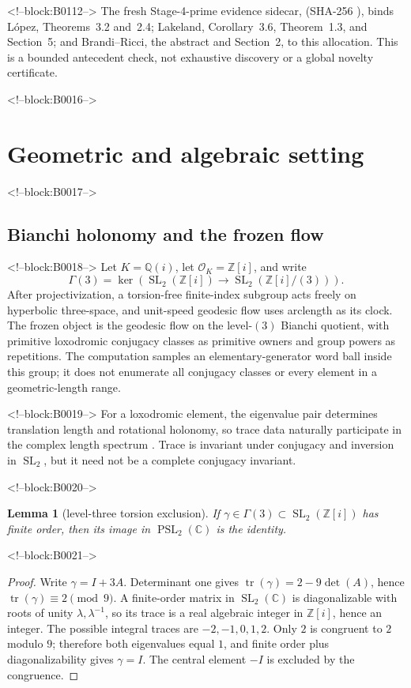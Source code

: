 \documentclass[11pt,a4paper]{article}
\newtheorem{lemma}[theorem]{Lemma}
\theoremstyle{definition}
\theoremstyle{remark}
\newcommand{\SL}{\operatorname{SL}}
\newcommand{\tr}{\operatorname{tr}}
\newcommand{\Gauss}{\mathbb{Z}[i]}
\begin{document}
<!--block:B0112-->
The fresh Stage-4-prime evidence sidecar,  (SHA-256 ), binds López, Theorems~3.2 and~2.4; Lakeland, Corollary~3.6, Theorem~1.3, and Section~5; and Brandi--Ricci, the abstract and Section~2, to this allocation. This is a bounded antecedent check, not exhaustive discovery or a global novelty certificate.

<!--block:B0016-->
\section{Geometric and algebraic setting}

<!--block:B0017-->
\subsection{Bianchi holonomy and the frozen flow}

<!--block:B0018-->
Let \(K=\mathbb{Q}(i)\), let \(\mathcal O_K=\Gauss\), and write
\[
 \Gamma(3)=\ker\!\left(\SL_2(\Gauss)\longrightarrow\SL_2(\Gauss/(3))\right).
\]
After projectivization, a torsion-free finite-index subgroup acts freely on hyperbolic three-space, and unit-speed geodesic flow uses arclength as its clock. The frozen object is the geodesic flow on the level-\((3)\) Bianchi quotient, with primitive loxodromic conjugacy classes as primitive owners and group powers as repetitions. The computation samples an elementary-generator word ball inside this group; it does not enumerate all conjugacy classes or every element in a geometric-length range.

<!--block:B0019-->
For a loxodromic element, the eigenvalue pair determines translation length and rotational holonomy, so trace data naturally participate in the complex length spectrum \citep[Introduction and Sec.~2]{LinLipnowski2022}. Trace is invariant under conjugacy and inversion in \(\SL_2\), but it need not be a complete conjugacy invariant.

<!--block:B0020-->
\begin{lemma}[level-three torsion exclusion]\label{lem:torsion}
If \(\gamma\in\Gamma(3)\subset\SL_2(\Gauss)\) has finite order, then its image in \(\operatorname{PSL}_2(\mathbb C)\) is the identity.
\end{lemma}

<!--block:B0021-->
\begin{proof}
Write \(\gamma=I+3A\). Determinant one gives \(\tr(\gamma)=2-9\det(A)\), hence \(\tr(\gamma)\equiv2\pmod 9\). A finite-order matrix in \(\SL_2(\mathbb C)\) is diagonalizable with roots of unity \(\lambda,\lambda^{-1}\), so its trace is a real algebraic integer in \(\Gauss\), hence an integer. The possible integral traces are \(-2,-1,0,1,2\). Only \(2\) is congruent to \(2\) modulo \(9\); therefore both eigenvalues equal \(1\), and finite order plus diagonalizability gives \(\gamma=I\). The central element \(-I\) is excluded by the congruence.
\end{proof}
\end{document}
